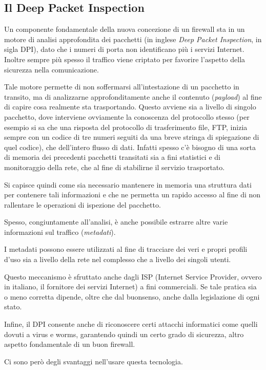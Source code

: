 \subsection{Il Deep Packet Inspection}

Un componente fondamentale della nuova concezione di un firewall sta in un motore di analisi approfondita dei pacchetti \cite{dpi} (in inglese \emph{Deep Packet Inspection}, in sigla DPI), dato che i numeri di porta non identificano più i servizi Internet. Inoltre sempre più spesso il traffico viene criptato per favorire l'aspetto della sicurezza nella comunicazione.

Tale motore permette di non soffermarsi all'intestazione di un pacchetto in transito, ma di analizzarne approfonditamente anche il contenuto (\emph{payload}) al fine di capire cosa realmente sta trasportando. Questo avviene sia a livello di singolo pacchetto, dove interviene ovviamente la conoscenza del protocollo stesso (per esempio si sa che una risposta del protocollo di trasferimento file, FTP, inizia sempre con un codice di tre numeri seguiti da una breve stringa di spiegazione di quel codice), che dell'intero flusso di dati. Infatti spesso c'è bisogno di una sorta di memoria dei precedenti pacchetti transitati sia a fini statistici e di monitoraggio della rete, che al fine di stabilirne il servizio trasportato.

Si capisce quindi come sia necessario mantenere in memoria una struttura dati per contenere tali informazioni e che ne permetta un rapido accesso al fine di non rallentare le operazioni di ispezione del pacchetto.

Spesso, congiuntamente all'analisi, è anche possibile estrarre altre varie informazioni sul traffico (\emph{metadati}).

I metadati possono essere utilizzati al fine di tracciare dei veri e propri profili d'uso sia a livello della rete nel complesso che a livello dei singoli utenti.

Questo meccanismo è sfruttato anche dagli ISP (Internet Service Provider, ovvero in italiano, il fornitore dei servizi Internet) a fini commerciali. Se tale pratica sia o meno corretta dipende, oltre che dal buonsenso, anche dalla legislazione di ogni stato.

Infine, il DPI consente anche di riconoscere certi attacchi informatici come quelli dovuti a virus e worms, garantendo quindi un certo grado di sicurezza, altro aspetto fondamentale di un buon firewall.

Ci sono però degli svantaggi nell'usare questa tecnologia.

